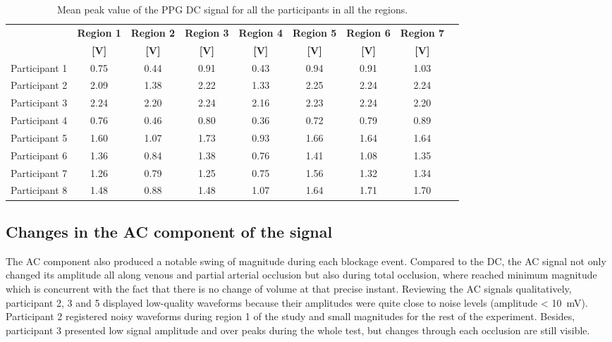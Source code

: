 \begin{table}[!htbp]
	\caption[Mean peak value of the PPG DC signal for all participants in all regions]{Mean peak value of the PPG DC signal for all the participants in all the regions.}
	\label{tbl:PPG RED-DC}
	\centering \small
	\begin{tabular}{lcccccccc}
		\toprule
		& \textbf{Region 1}
		& \textbf{Region 2}
		& \textbf{Region 3}
		& \textbf{Region 4}
		& \textbf{Region 5}
		& \textbf{Region 6}
		& \textbf{Region 7} \\
		& \textbf{[\si{\volt}]}
		& \textbf{[\si{\volt}]}
		& \textbf{[\si{\volt}]}		
		& \textbf{[\si{\volt}]}		
		& \textbf{[\si{\volt}]}
		& \textbf{[\si{\volt}]}
		& \textbf{[\si{\volt}]}\\\midrule
		Participant 1 & 0.75 & 0.44 & 0.91 & 0.43 & 0.94 & 0.91 & 1.03 \\  
		Participant 2 & 2.09 & 1.38 & 2.22 & 1.33 & 2.25 & 2.24 & 2.24 \\  
		Participant 3 & 2.24 & 2.20 & 2.24 & 2.16 & 2.23 & 2.24 & 2.20 \\  
		Participant 4 & 0.76 & 0.46 & 0.80 & 0.36 & 0.72 & 0.79 & 0.89 \\  
		Participant 5 & 1.60 & 1.07 & 1.73 & 0.93 & 1.66 & 1.64 & 1.64 \\  
		Participant 6 & 1.36 & 0.84 & 1.38 & 0.76 & 1.41 & 1.08 & 1.35 \\  
		Participant 7 & 1.26 & 0.79 & 1.25 & 0.75 & 1.56 & 1.32 & 1.34 \\  
		Participant 8 & 1.48 & 0.88 & 1.48 & 1.07 & 1.64 & 1.71 & 1.70 \\  
		\bottomrule
	\end{tabular}
\end{table}

\subsection{Changes in the AC component of the signal}
\label{section comparison 4.2}
The AC component also produced a notable swing of magnitude during each blockage event. Compared to the DC, the AC signal not only changed its amplitude all along venous and partial arterial occlusion but also during total occlusion, where reached minimum magnitude which is concurrent with the fact that there is no change of volume at that precise instant. Reviewing the AC signals qualitatively, participant 2, 3 and 5 displayed low-quality waveforms because their amplitudes were quite close to noise levels  (amplitude < \SI{10}{\milli\volt}).   Participant 2 registered noisy waveforms during region 1 of the study and small magnitudes for the rest of the experiment. Besides, participant 3 presented low signal amplitude and over peaks during the whole test, but changes through each occlusion are still visible.

